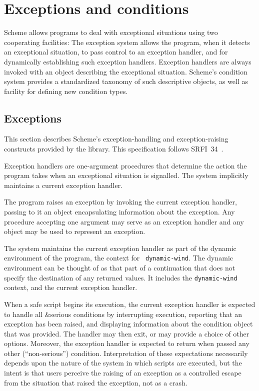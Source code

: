 \chapter{Exceptions and conditions}
\label{exceptionsconditionschapter}

Scheme allows programs to deal with exceptional situations using two
cooperating facilities: The exception system allows the program, when
it detects an exceptional situation, to pass control to an exception
handler, and for dynamically establishing such exception handlers.
Exception handlers are always invoked with an object describing the
exceptional situation.  Scheme's condition system provides a
standardized taxonomy of such descriptive objects, as well as facility
for defining new condition types.

\section{Exceptions}
\label{exceptionssection}

This section describes Scheme's exception-handling and
exception-raising constructs provided by the  library.  This specification follows
SRFI~34~\cite{srfi34}.

Exception handlers are one-argument procedures that determine the
action the program takes when an exceptional situation is signalled.
The system implicitly maintains a current exception handler.

The program raises an exception
by invoking the current exception handler, passing to it an object
encapsulating information about the exception. Any procedure accepting
one argument may serve as an exception handler and any object may be
used to represent an exception.

The system maintains the current exception handler as part of the
dynamic environment of the program, the context for {\tt
  dynamic-wind}. The dynamic environment can be thought of as that
part of a continuation that does not specify the destination of any
returned values. It includes the {\tt dynamic-wind} context, and the
current exception handler.

When a safe script begins its execution, the current
exception handler is expected to handle all {\cf\&serious}
conditions by interrupting execution, reporting that an
exception has been raised, and displaying information
about the condition object that was provided.  The handler
may then exit, or may provide a choice of other options.
Moreover, the exception handler is expected to return when
passed any other (``non-serious'') condition.
Interpretation of these expectations necessarily depends
upon the nature of the system in which scripts are executed,
but the intent is that users perceive the raising of an
exception as a controlled escape from the situation that
raised the exception, not as a crash.

